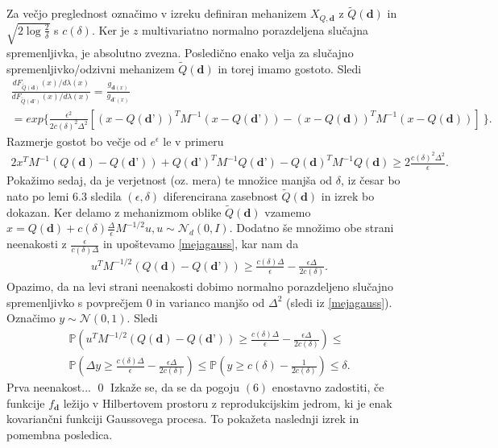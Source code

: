 \documentclass[12pt,a4paper]{amsart}
\theoremstyle{definition} %
\theoremstyle{plain} %
\begin{document}
Za večjo preglednost označimo v izreku definiran mehanizem $X_{Q, \textbf{d}}$ z $\tilde{Q}(\textbf{d})$ in  $\sqrt{2\log{\frac{2}{\delta}}}$ s $c(\delta)$. Ker je $z$ multivariatno normalno porazdeljena slučajna spremenljivka, je absolutno zvezna. Posledično enako velja za slučajno spremenljivko/odzivni mehanizem $\tilde{Q}(\textbf{d})$ in torej imamo gostoto. Sledi
\begin{gather*}
\frac{dF_{\tilde{Q}(\textbf{d})}(x)/d \lambda (x)}{dF_{\tilde{Q}(\textbf{d'})}(x)/d \lambda (x)} = \frac{g_{\textbf{d} (x)}}{g_{\textbf{d'} (x)}} \\ 
=  exp \{ \frac{\epsilon^2}{2c(\delta)^2 \Delta^2} [ (x-Q(\textbf{d'}))^T M^{-1} (x-Q(\textbf{d'})) - (x-Q(\textbf{d}))^T M^{-1} (x-Q(\textbf{d}))]\ \}.
\end{gather*}
Razmerje gostot bo večje od $e^{\epsilon}$ le v primeru
\begin{gather*}
2x^T M^{-1}(Q(\textbf{d})-Q(\textbf{d'})) + Q(\textbf{d'})^T M^{-1} Q(\textbf{d'}) - Q(\textbf{d})^T M^{-1} Q(\textbf{d}) \geq 2 \frac{c(\delta)^2 \Delta^2}{\epsilon}.
\end{gather*}
Pokažimo sedaj, da je verjetnost (oz. mera) te množice manjša od $\delta$, iz česar bo nato po lemi 6.3 sledila $(\epsilon, \delta)$  diferencirana zasebnost $\tilde{Q}(\textbf{d})$ in izrek bo dokazan.
\newline
\newline
Ker delamo z mehanizmom oblike $\tilde{Q}(\textbf{d})$ vzamemo $x = Q(\textbf{d}) + c(\delta) \frac{\Delta}{\epsilon} M^{-1/2}u, u \sim \mathcal{N}_d (0,I)$. Dodatno še množimo obe strani neenakosti z $\frac{\epsilon}{c(\delta)\Delta}$ in upoštevamo \eqref{mejagauss}, kar nam da
\begin{gather*}
u^T M^{-1/2}(Q(\textbf{d})-Q(\textbf{d'})) \geq \frac{c(\delta)\Delta}{\epsilon} - \frac{\epsilon \Delta}{2 c(\delta)}.
\end{gather*}
Opazimo, da na levi strani neenakosti dobimo normalno porazdeljeno slučajno spremenljivko s povprečjem 0 in varianco manjšo od $\Delta^2$ (sledi iz \eqref{mejagauss}). Označimo $y \sim \mathcal{N}(0,1)$. Sledi 
\begin{gather*}
\mathbb{P}(u^T M^{-1/2}(Q(\textbf{d})-Q(\textbf{d'})) \geq \frac{c(\delta)\Delta}{\epsilon} - \frac{\epsilon \Delta}{2 c(\delta)}) \leq \\
\mathbb{P}(\Delta y \geq \frac{c(\delta)\Delta}{\epsilon} - \frac{\epsilon \Delta}{2 c(\delta)}) \leq \mathbb{P}(y \geq c(\delta) - \frac{1}{2 c(\delta)}) \leq \delta.
\end{gather*}
Prva neenakost...
\qed
\newline
\newline
Izkaže se, da se da pogoju $(6)$ enostavno zadostiti, če funkcije $f_{\textbf{d}}$ ležijo v Hilbertovem prostoru z reprodukcijskim jedrom, ki je enak kovariančni funkciji Gaussovega procesa. To pokažeta naslednji izrek in pomembna posledica.
\end{document}
